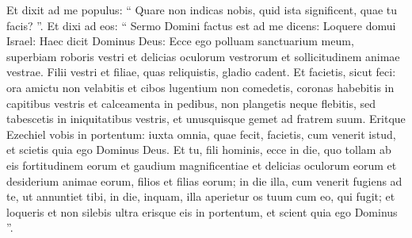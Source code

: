 \begin{biblechapter}
\begin{biblechapter}
\begin{biblechapter}
\begin{biblechapter}
\begin{biblechapter}
\begin{biblechapter}
\begin{biblechapter}
\begin{biblechapter}
\begin{biblechapter}
\begin{biblechapter}
\begin{biblechapter}
\begin{biblechapter}
\begin{biblechapter}
\begin{biblechapter}
\begin{biblechapter}
\begin{biblechapter}
\begin{biblechapter}
\begin{biblechapter}
\begin{biblechapter}
\begin{biblechapter}
\begin{biblechapter}
\begin{biblechapter}
\begin{biblechapter}
\begin{biblechapter}
\verse Et dixit ad me populus: “ Quare non indicas nobis, quid ista significent, quae tu facis? ”. 
\verse Et dixi ad eos: “ Sermo Domini factus est ad me dicens: 
\verse Loquere domui Israel: Haec dicit Dominus Deus: Ecce ego polluam sanctuarium meum, superbiam roboris vestri et delicias oculorum vestrorum et sollicitudinem animae vestrae. Filii vestri et filiae, quas reliquistis, gladio cadent. 
\verse Et facietis, sicut feci: ora amictu non velabitis et cibos lugentium non comedetis, 
\verse coronas habebitis in capitibus vestris et calceamenta in pedibus, non plangetis neque flebitis, sed tabescetis in iniquitatibus vestris, et unusquisque gemet ad fratrem suum. 
\verse Eritque Ezechiel vobis in portentum: iuxta omnia, quae fecit, facietis, cum venerit istud, et scietis quia ego Dominus Deus.
 \verse Et tu, fili hominis, ecce in die, quo tollam ab eis fortitudinem eorum et gaudium magnificentiae et delicias oculorum eorum et desiderium animae eorum, filios et filias eorum; 
\verse in die illa, cum venerit fugiens ad te, ut annuntiet tibi, 
\verse in die, inquam, illa aperietur os tuum cum eo, qui fugit; et loqueris et non silebis ultra erisque eis in portentum, et scient quia ego Dominus ”.
 

\end{biblechapter}
\end{biblechapter}
\end{biblechapter}
\end{biblechapter}
\end{biblechapter}
\end{biblechapter}
\end{biblechapter}
\end{biblechapter}
\end{biblechapter}
\end{biblechapter}
\end{biblechapter}
\end{biblechapter}
\end{biblechapter}
\end{biblechapter}
\end{biblechapter}
\end{biblechapter}
\end{biblechapter}
\end{biblechapter}
\end{biblechapter}
\end{biblechapter}
\end{biblechapter}
\end{biblechapter}
\end{biblechapter}
\end{biblechapter}
